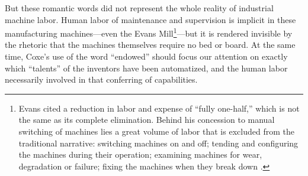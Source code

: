 But these romantic words did not represent the whole reality of
industrial machine labor. Human labor of
maintenance and supervision is implicit in these manufacturing
machines---even the Evans Mill\footnote{Evans cited a reduction in
  labor and expense of ``fully one-half,'' which is not the same as
  its complete elimination. Behind his concession to manual switching
  of machines lies a great volume of labor that is excluded
  from the traditional narrative: switching machines on and off;
  tending and configuring the machines during their operation; examining machines for
  wear, degradation or failure; fixing the machines when they break
  down \cite{evansMillguide}.}---but it is rendered invisible by the
rhetoric that the 
machines themselves require no bed or board. At the same time, Coxe's
use of the word ``endowed'' should focus our attention on exactly which
``talents'' of the inventors have been automatized, and the human
labor necessarily involved in that conferring of capabilities. 

